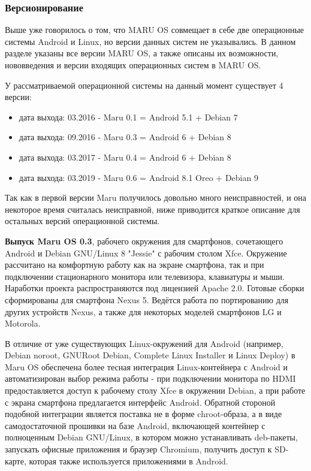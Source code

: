 \documentclass[a4paper, 14pt]{article}
\begin{document}


\subsubsection{Версионирование}
\par Выше уже говорилось о том, что MARU OS совмещает в себе две операционные системы Android и Linux, но версии данных систем не указывались. В данном разделе указаны все версии MARU OS, а также описаны их возможности, нововведения и версии входящих операционных систем в MARU OS.
\par У рассматриваемой операционной системы на данный момент существует 4 версии:
\begin{itemize}
    \item дата выхода: 03.2016 - Maru 0.1 = Android 5.1 + Debian 7 
    \item дата выхода: 09.2016 - Maru 0.3 = Android 6 + Debian 8
    \item дата выхода: 03.2017 - Maru 0.4 = Android 6 + Debian 8
    \item дата выхода: 03.2019 - Maru 0.6 = Android 8.1 Oreo + Debian 9
\end{itemize}

\par Так как в первой версии Maru получилось довольно много неисправностей, и она некоторое время считалась неисправной, ниже приводится краткое описание для остальных версий операционной системы.

\par \textbf{Выпуск Maru OS 0.3}, рабочего окружения для смартфонов, сочетающего Android и Debian GNU/Linux 8 "Jessie" с рабочим столом Xfce. Окружение рассчитано на комфортную работу как на экране смартфона, так и при подключении стационарного монитора или телевизора, клавиатуры и мыши. Наработки проекта распространяются под лицензией Apache 2.0. Готовые сборки сформированы для смартфона Nexus 5. Ведётся работа по портированию для других устройств Nexus, а также для некоторых моделей смартфонов LG и Motorola.

\par В отличие от уже существующих Linux-окружений для Android (например, Debian noroot, GNURoot Debian, Complete Linux Installer и Linux Deploy) в Maru OS обеспечена более тесная интеграция Linux-контейнера с Android и автоматизирован выбор режима работы - при подключении монитора по HDMI предоставляется доступ к рабочему столу Xfce в окружении Debian, а при работе с экрана смартфона предлагается интерфейс Android. Обратной стороной подобной интеграции является поставка не в форме chroot-образа, а в виде самодостаточной прошивки на базе Android, включающей контейнер с полноценным Debian GNU/Linux, в котором можно устанавливать deb-пакеты, запускать офисные приложения и браузер Chromium, получить доступ к SD-карте, которая также используется приложениями в Android.
\end{document}

